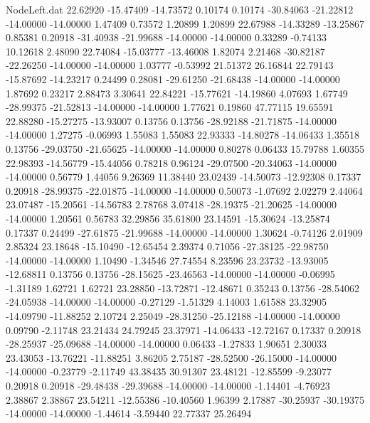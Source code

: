 \begin{filecontents}{NodeLeft.dat}
  22.62920  -15.47409  -14.73572     0.10174    0.10174  -30.84063  -21.22812  -14.00000  -14.00000    1.47409    0.73572    1.20899    1.20899
  22.67988  -14.33289  -13.25867     0.85381    0.20918  -31.40938  -21.99688  -14.00000  -14.00000    0.33289   -0.74133   10.12618    2.48090
  22.74084  -15.03777  -13.46008     1.82074    2.21468  -30.82187  -22.26250  -14.00000  -14.00000    1.03777   -0.53992   21.51372   26.16844
  22.79143  -15.87692  -14.23217     0.24499    0.28081  -29.61250  -21.68438  -14.00000  -14.00000    1.87692    0.23217    2.88473    3.30641
  22.84221  -15.77621  -14.19860     4.07693    1.67749  -28.99375  -21.52813  -14.00000  -14.00000    1.77621    0.19860   47.77115   19.65591
  22.88280  -15.27275  -13.93007     0.13756    0.13756  -28.92188  -21.71875  -14.00000  -14.00000    1.27275   -0.06993    1.55083    1.55083
  22.93333  -14.80278  -14.06433     1.35518    0.13756  -29.03750  -21.65625  -14.00000  -14.00000    0.80278    0.06433   15.79788    1.60355
  22.98393  -14.56779  -15.44056     0.78218    0.96124  -29.07500  -20.34063  -14.00000  -14.00000    0.56779    1.44056    9.26369   11.38440
  23.02439  -14.50073  -12.92308     0.17337    0.20918  -28.99375  -22.01875  -14.00000  -14.00000    0.50073   -1.07692    2.02279    2.44064
  23.07487  -15.20561  -14.56783     2.78768    3.07418  -28.19375  -21.20625  -14.00000  -14.00000    1.20561    0.56783   32.29856   35.61800
  23.14591  -15.30624  -13.25874     0.17337    0.24499  -27.61875  -21.99688  -14.00000  -14.00000    1.30624   -0.74126    2.01909    2.85324
  23.18648  -15.10490  -12.65454     2.39374    0.71056  -27.38125  -22.98750  -14.00000  -14.00000    1.10490   -1.34546   27.74554    8.23596
  23.23732  -13.93005  -12.68811     0.13756    0.13756  -28.15625  -23.46563  -14.00000  -14.00000   -0.06995   -1.31189    1.62721    1.62721
  23.28850  -13.72871  -12.48671     0.35243    0.13756  -28.54062  -24.05938  -14.00000  -14.00000   -0.27129   -1.51329    4.14003    1.61588
  23.32905  -14.09790  -11.88252     2.10724    2.25049  -28.31250  -25.12188  -14.00000  -14.00000    0.09790   -2.11748   23.21434   24.79245
  23.37971  -14.06433  -12.72167     0.17337    0.20918  -28.25937  -25.09688  -14.00000  -14.00000    0.06433   -1.27833    1.90651    2.30033
  23.43053  -13.76221  -11.88251     3.86205    2.75187  -28.52500  -26.15000  -14.00000  -14.00000   -0.23779   -2.11749   43.38435   30.91307
  23.48121  -12.85599   -9.23077     0.20918    0.20918  -29.48438  -29.39688  -14.00000  -14.00000   -1.14401   -4.76923    2.38867    2.38867
  23.54211  -12.55386  -10.40560     1.96399    2.17887  -30.25937  -30.19375  -14.00000  -14.00000   -1.44614   -3.59440   22.77337   25.26494

\end{filecontents}
